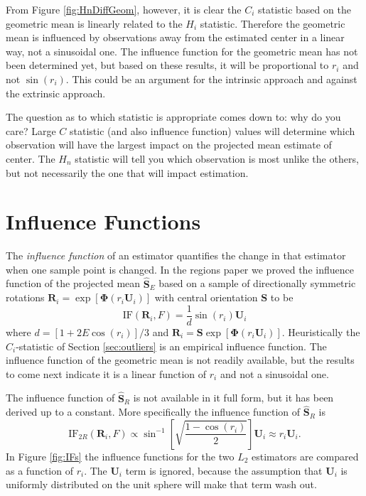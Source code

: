 \documentclass{article}\usepackage[]{graphicx}\usepackage[]{color}
\newcommand{\ProjMean}{{\widehat{\bm S}_{E}}}
\newcommand{\GeomMean}{{\widehat{\bm S}_{R}}}
\begin{document}
From Figure \ref{fig:HnDiffGeom}, however, it is clear the $C_i$ statistic based on the geometric mean is linearly related to the $H_i$ statistic.  Therefore the geometric mean is influenced by observations away from the estimated center in a linear way, not a sinusoidal one.  The influence function for the geometric mean has not been determined yet, but based on these results, it will be proportional to $r_i$ and not $\sin(r_i)$.  This could be an argument for the intrinsic approach and against the extrinsic approach.


The question as to which statistic is appropriate comes down to: why do you care?  Large $C$ statistic (and also influence function) values will determine which observation will have the largest impact on the projected mean estimate of center.  The $H_n$ statistic will tell you which observation is most unlike the others, but not necessarily the one that will impact estimation.

\section{Influence Functions}\label{sec:ifs}

The \emph{influence function} of an estimator quantifies the change in that estimator when one sample point is changed.  In the regions paper we proved the influence function of the projected mean $\ProjMean$ based on a sample of directionally symmetric rotations $\bm R_i=\exp[\bm \Phi(r_i\bm U_i)]$ with central orientation $\bm S$ to be
\begin{equation}\label{eqn:IF}
\text{IF}(\bm R_i,F)=\frac{1}{d}\sin(r_i)\bm U_i
\end{equation}
where $d=[1+2E\cos(r_i)]/3$ and $\bm R_i=\bm S\exp[\bm\Phi(r_i\bm U_i)]$.  Heuristically the $C_i$-statistic of Section \ref{sec:outliers} is an empirical influence function.  The influence function of the geometric mean is not readily available, but the results to come next indicate it is a linear function of $r_i$ and not a sinusoidal one.

The influence function of $\GeomMean$ is not available in it full form, but it has been derived up to a constant.  More specifically the influence function of $\GeomMean$ is
\[
\text{IF}_{2R}(\bm R_i,F)\propto\sin^{-1}\left[\sqrt{\frac{1-\cos(r_i)}{2}}\right]\bm U_i\approx r_i\bm U_i.
\]
In Figure \ref{fig:IFs} the influence functions for the two $L_2$ estimators are compared as a function of $r_i$.  The $\bm U_i$ term is ignored, because the assumption that $\bm U_i$ is uniformly distributed on the unit sphere will make that term wash out.
 
\end{document}
